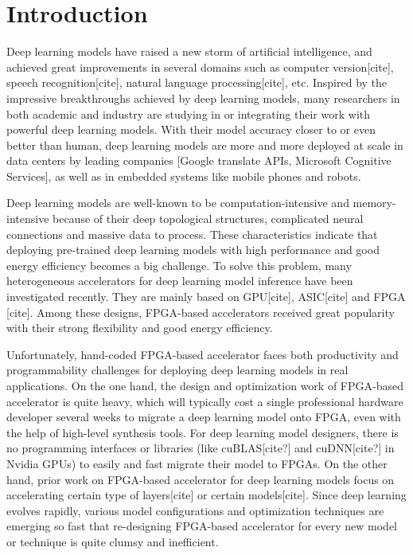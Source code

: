 \documentclass{acm_proc_article-sp-copy}
\begin{document}
\section{Introduction}
Deep learning models have raised a new storm of artificial intelligence, and achieved great improvements in several domains such as computer version[cite], speech recognition[cite], natural language processing[cite], etc. Inspired by the impressive breakthroughs achieved by deep learning models, many researchers in both academic and industry are studying in or integrating their work with powerful deep learning models. With their model accuracy closer to or even better than human, deep learning models are more and more deployed at scale in data centers by leading companies [Google translate APIs, Microsoft Cognitive Services], as well as in embedded systems like mobile phones and robots.

Deep learning models are well-known to be computation-intensive and memory-intensive because of their deep topological structures, complicated neural connections and massive data to process. These characteristics indicate that deploying pre-trained deep learning models with high performance and good energy efficiency becomes a big challenge. To solve this problem, many heterogeneous accelerators for deep learning model inference have been investigated recently. They are mainly based on GPU[cite], ASIC[cite] and FPGA [cite]. Among these designs, FPGA-based accelerators received great popularity with their strong flexibility and good energy efficiency.

Unfortunately, hand-coded FPGA-based accelerator faces both productivity and programmability challenges for deploying deep learning models in real applications. On the one hand, the design and optimization work of FPGA-based accelerator is quite heavy, which will typically cost a single professional hardware developer several weeks to migrate a deep learning model onto FPGA, even with the help of high-level synthesis tools. For deep learning model designers, there is no programming interfaces or libraries (like cuBLAS[cite?] and cuDNN[cite?] in Nvidia GPUs)  to easily and fast migrate their model to FPGAs. On the other hand, prior work on FPGA-based accelerator for deep learning models focus on accelerating certain type of layers[cite] or certain models[cite]. Since deep learning evolves rapidly, various model configurations and optimization techniques are emerging so fast that re-designing FPGA-based accelerator for every new model or technique is quite clumsy and inefficient.
\end{document}
